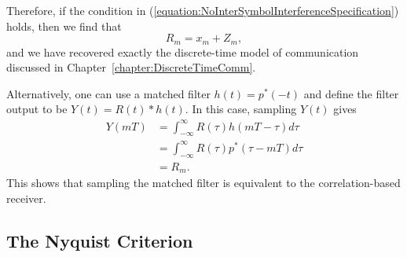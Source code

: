 \begin{example}
Therefore, if the condition in (\ref{equation:NoInterSymbolInterferenceSpecification}) holds, then we find that
\[ R_m = x_m + Z_m, \]
and we have recovered exactly the discrete-time model of communication discussed in Chapter~\ref{chapter:DiscreteTimeComm}.
\end{example}

Alternatively, one can use a matched filter $h(t) = p^* (-t)$ and define the filter output to be $Y(t) = R(t) * h(t)$.
In this case, sampling $Y(t)$ gives
\begin{align*}
Y(mT)
&= \int_{-\infty}^{\infty} R(\tau) h(mT-\tau) d \tau \\
&= \int_{-\infty}^{\infty} R(\tau) p^* (\tau - mT) d \tau \\
&= R_m .
\end{align*}
This shows that sampling the matched filter is equivalent to the correlation-based receiver.

\subsection{The Nyquist Criterion}

